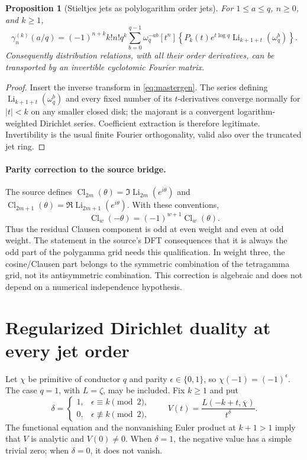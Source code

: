 \documentclass[11pt]{article}
\newtheorem{proposition}[theorem]{Proposition}
\theoremstyle{definition}
\theoremstyle{remark}
\DeclareMathOperator{\Li}{Li}
\DeclareMathOperator{\Cl}{Cl}
\begin{document}
\begin{proposition}[Stieltjes jets as polylogarithm order jets]\label{prop:DFTjets}
For $1\leq a\leq q$, $n\geq0$, and $k\geq1$,
\begin{equation}\label{eq:DFTjets}
 \gamma_n^{(k)}(a/q)
 =(-1)^{n+k}k!n!q^k\sum_{b=0}^{q-1}\omega_q^{-ab}
       [t^n]\left\{P_k(t)e^{t\log q}\Li_{k+1+t}(\omega_q^b)\right\}.
\end{equation}
Consequently distribution relations, with all their order derivatives, can be transported by an invertible cyclotomic Fourier matrix.
\end{proposition}
\begin{proof}
Insert the inverse transform in \eqref{eq:mastergen}. The series defining $\Li_{k+1+t}(\omega_q^b)$ and every fixed number of its $t$-derivatives converge normally for $|t|<k$ on any smaller closed disk; the majorant is a convergent logarithm-weighted Dirichlet series. Coefficient extraction is therefore legitimate. Invertibility is the usual finite Fourier orthogonality, valid also over the truncated jet ring.
\end{proof}

\paragraph{Parity correction to the source bridge.}
The source defines
$\Cl_{2m}(\theta)=\Im\Li_{2m}(e^{i\theta})$ and
$\Cl_{2m+1}(\theta)=\Re\Li_{2m+1}(e^{i\theta})$. With these conventions,
\begin{equation}\label{eq:parity}
 \Cl_w(-\theta)=(-1)^{w+1}\Cl_w(\theta).
\end{equation}
Thus the residual Clausen component is odd at even weight and even at odd weight. The statement in the source's DFT consequences that it is always the odd part of the polygamma grid needs this qualification. In weight three, the cosine/Clausen part belongs to the symmetric combination of the tetragamma grid, not its antisymmetric combination. This correction is algebraic and does not depend on a numerical independence hypothesis.

\section{Regularized Dirichlet duality at every jet order}
\label{sec:duality}

Let $\chi$ be primitive of conductor $q$ and parity $\epsilon\in\{0,1\}$, so $\chi(-1)=(-1)^\epsilon$. The case $q=1$, with $L=\zeta$, may be included. Fix $k\geq1$ and put
\begin{equation}\label{eq:delta}
 \delta=\begin{cases}1,&\epsilon\equiv k\pmod2,\\0,&\epsilon\not\equiv k\pmod2,\end{cases}
 \qquad V(t)=\frac{L(-k+t,\overline\chi)}{t^\delta}.
\end{equation}
The functional equation and the nonvanishing Euler product at $k+1>1$ imply that $V$ is analytic and $V(0)\neq0$. When $\delta=1$, the negative value has a simple trivial zero; when $\delta=0$, it does not vanish.
\end{document}
